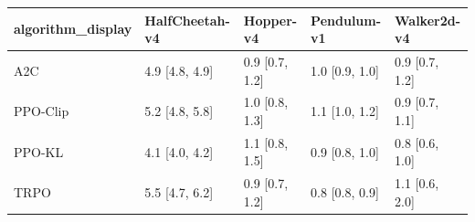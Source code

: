 \begin{tabular}{lllll}
\toprule
algorithm_display & HalfCheetah-v4 & Hopper-v4 & Pendulum-v1 & Walker2d-v4 \\
\midrule
A2C & 4.9 [4.8, 4.9] & 0.9 [0.7, 1.2] & 1.0 [0.9, 1.0] & 0.9 [0.7, 1.2] \\
PPO-Clip & 5.2 [4.8, 5.8] & 1.0 [0.8, 1.3] & 1.1 [1.0, 1.2] & 0.9 [0.7, 1.1] \\
PPO-KL & 4.1 [4.0, 4.2] & 1.1 [0.8, 1.5] & 0.9 [0.8, 1.0] & 0.8 [0.6, 1.0] \\
TRPO & 5.5 [4.7, 6.2] & 0.9 [0.7, 1.2] & 0.8 [0.8, 0.9] & 1.1 [0.6, 2.0] \\
\bottomrule
\end{tabular}
